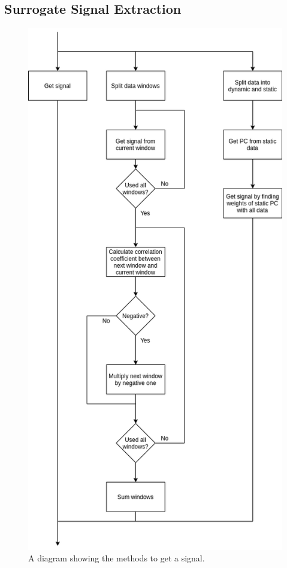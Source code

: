             \subsection{Surrogate Signal Extraction} \label{sec:pca_data_driven_surrogate_signal_extraction_methods_for_dynamic_pet_methods_surrogate_signal_extraction}
                \begin{figure}
                    \centering
                    
                    \includegraphics[width=0.7\linewidth]{figures/data_driven_surrogate_signal_extraction_methods_1_get_signal.png}
                    
                    \captionsetup{singlelinecheck=false}
                    \caption{
                        A diagram showing the methods to get a signal.
                    }
                    \label{fig:pca_data_driven_surrogate_signal_extraction_methods_for_dynamic_pet_methods_get_signal}
                \end{figure}
                
